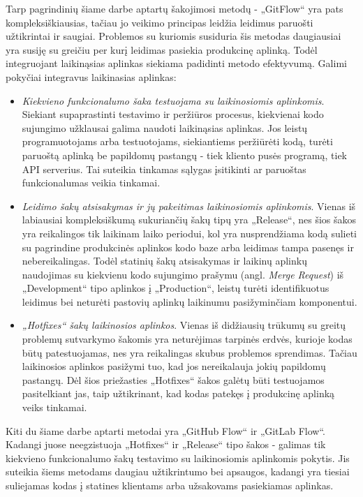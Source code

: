 \documentclass{VUMIFPSkursinis}
\begin{document}
Tarp pagrindinių šiame darbe aptartų šakojimosi metodų - „GitFlow“ yra pats kompleksiškiausias, tačiau jo veikimo principas leidžia leidimus paruošti užtikrintai ir saugiai. Problemos su kuriomis susiduria šis metodas daugiausiai yra susiję su greičiu per kurį leidimas pasiekia produkcinę aplinką. Todėl integruojant laikinąsias aplinkas siekiama padidinti metodo efektyvumą. Galimi pokyčiai integravus laikinasias aplinkas: 

\begin{itemize}
  \item \textit{Kiekvieno funkcionalumo šaka testuojama su laikinosiomis aplinkomis}. Siekiant supaprastinti testavimo ir peržiūros procesus, kiekvienai kodo sujungimo užklausai galima naudoti laikinąsias aplinkas. Jos leistų programuotojams arba testuotojams, siekiantiems peržiūrėti kodą, turėti paruoštą aplinką be papildomų pastangų - tiek kliento pusės programą, tiek API serverius. Tai suteikia tinkamas sąlygas įsitikinti ar paruoštas funkcionalumas veikia tinkamai.

  \item \textit{Leidimo šakų atsisakymas ir jų pakeitimas laikinosiomis aplinkomis}. Vienas iš labiausiai kompleksiškumą sukuriančių šakų tipų yra „Release“, nes šios šakos yra reikalingos tik laikinam laiko periodui, kol yra nusprendžiama kodą sulieti su pagrindine produkcinės aplinkos kodo baze arba leidimas tampa pasenęs ir nebereikalingas. Todėl statinių šakų atsisakymas ir laikinų aplinkų naudojimas su kiekvienu kodo sujungimo prašymu (angl. \textit{Merge Request}) iš „Development“ tipo aplinkos į „Production“, leistų turėti identifikuotus leidimus bei neturėti pastovių aplinkų laikinumu pasižyminčiam komponentui.
  
  \item \textit{„Hotfixes“ šakų laikinosios aplinkos}. Vienas iš didžiausių trūkumų su greitų problemų sutvarkymo šakomis yra neturėjimas tarpinės erdvės, kurioje kodas būtų patestuojamas, nes yra reikalingas skubus problemos sprendimas. Tačiau laikinosios aplinkos pasižymi tuo, kad jos nereikalauja jokių papildomų pastangų. Dėl šios priežasties „Hotfixes“ šakos galėtų būti testuojamos pasitelkiant jas, taip užtikrinant, kad kodas patekęs į produkcinę aplinką veiks tinkamai.

\end{itemize}

Kiti du šiame darbe aptarti metodai yra „GitHub Flow“ ir „GitLab Flow“. Kadangi juose neegzistuoja „Hotfixes“ ir „Release“ tipo šakos - galimas tik kiekvieno funkcionalumo šakų testavimo su laikinosiomis aplinkomis pokytis. Jis suteikia šiems metodams daugiau užtikrintumo bei apsaugos, kadangi yra tiesiai suliejamas kodas į statines klientams arba užsakovams pasiekiamas aplinkas.
\end{document}
